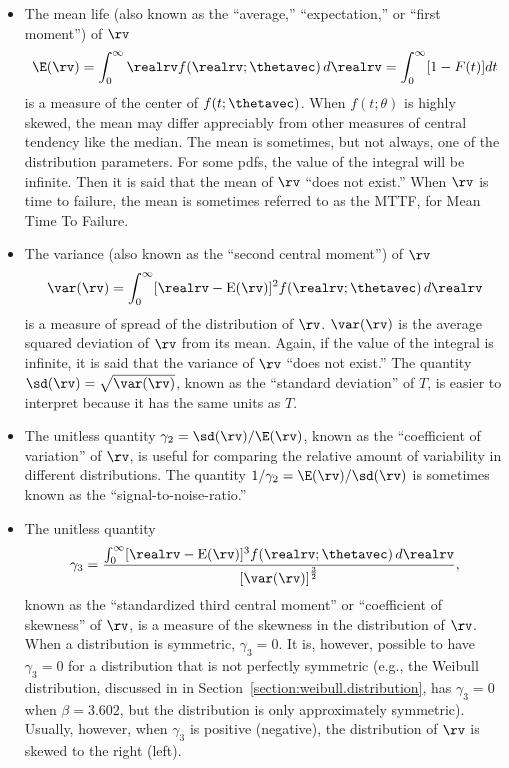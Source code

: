\begin{itemize}
\item
The mean life (also known as the ``average,'' ``expectation,'' or ``first
moment'') of $\rv$  
\begin{equation}
\label{equation:mttf}
\E(\rv)=\int_{0}^{\infty} \realrv f(\realrv;\thetavec)\, d\realrv
=\int_{0}^{\infty}[1-F(t)]dt
\end{equation}
is a measure of the center of $f(t;\thetavec)$. When $f(t;\theta)$ is
highly skewed, the mean may differ appreciably from other measures of
central tendency like the median. The mean is sometimes, but not
always, one of the distribution parameters. For some pdfs, the value
of the integral will be infinite. Then it is said that the mean of
$\rv$ ``does not exist.'' When $\rv$ is time to failure, the mean is
sometimes referred to as the MTTF, for Mean Time To Failure.
\item
The variance (also known as the ``second central moment'') of $\rv$
\begin{displaymath}
\var(\rv)=\int_{0}^{\infty} 
[\realrv- \mbox{E}(\rv)]^{2} f(\realrv;\thetavec)\, d\realrv
\end{displaymath}
is a measure of spread of the distribution of $\rv$.  $\var(\rv)$ is
the average squared deviation of $\rv$ from its mean.  Again, if the
value of the integral is infinite, it is said that the variance of
$\rv$ ``does not exist.'' The quantity $\sd(\rv)=\sqrt{\var(\rv)}$,
known as the ``standard deviation'' of $T$, is easier to interpret
because it has the same units as $T$.
\item
The unitless quantity $\gamma_{2} =\sd(\rv)/\E(\rv)$, known as
the ``coefficient of variation'' of $\rv$, is useful for comparing the
relative amount of variability in different distributions.  The
quantity $1/\gamma_{2}=\E(\rv)/\sd(\rv)$ is sometimes known as
the ``signal-to-noise-ratio.''
\item
The unitless quantity 
\begin{displaymath}
\gamma_{3} =  \frac{\int_{0}^{\infty} [\realrv- \mbox{E}(\rv)]^{3}
f(\realrv;\thetavec)\, d\realrv}{\left[\var(\rv) \right]^{\frac{3}{2}}},
\end{displaymath}
known as the ``standardized third central moment'' or ``coefficient of
skewness'' of $\rv$, is a measure of the skewness in the distribution
of $\rv$.  When a distribution is symmetric, $\gamma_{3}=0$. It is,
however, possible to have $\gamma_{3}=0$ for a distribution that is
not perfectly symmetric (e.g., the Weibull distribution, discussed in
in Section~\ref{section:weibull.distribution}, has $\gamma_{3}=0$ when
$\beta=3.602$, but the distribution is only approximately symmetric).
Usually, however, when $\gamma_{3}$ is positive (negative), the
distribution of $\rv$ is skewed to the right (left).
\end{itemize}
